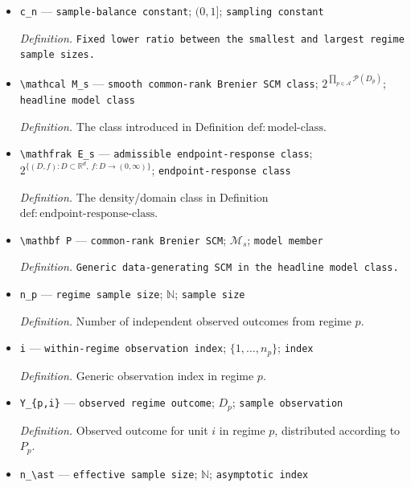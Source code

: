 \documentclass{article}
\begin{document}
\begin{itemize}
  \item \texttt{c\_\allowbreak{}n} --- \texttt{sample-\allowbreak{}balance constant}; \((0,1]\); \texttt{sampling constant}
  \par\smallskip\noindent\emph{Definition.} \texttt{Fixed lower ratio between the smallest and largest regime sample sizes.}
  \item \texttt{\textbackslash{}\allowbreak{}mathcal M\_\allowbreak{}s} --- \texttt{smooth common-\allowbreak{}rank Brenier SCM class}; \(2^{\prod_{p\in\mathcal A}\mathcal P(D_p)}\); \texttt{headline model class}
  \par\smallskip\noindent\emph{Definition.} The class introduced in Definition \(\mathrm{def:model\text{-}class}\).
  \item \texttt{\textbackslash{}\allowbreak{}mathfrak E\_\allowbreak{}s} --- \texttt{admissible endpoint-\allowbreak{}response class}; \(2^{\{(D,f):D\subset\mathbb R^d,\ f:D\to(0,\infty)\}}\); \texttt{endpoint-\allowbreak{}response class}
  \par\smallskip\noindent\emph{Definition.} The density/domain class in Definition \(\mathrm{def:endpoint\text{-}response\text{-}class}\).
  \item \texttt{\textbackslash{}\allowbreak{}mathbf P} --- \texttt{common-\allowbreak{}rank Brenier SCM}; \(\mathcal M_s\); \texttt{model member}
  \par\smallskip\noindent\emph{Definition.} \texttt{Generic data-\allowbreak{}generating SCM in the headline model class.}
  \item \texttt{n\_\allowbreak{}p} --- \texttt{regime sample size}; \(\mathbb N\); \texttt{sample size}
  \par\smallskip\noindent\emph{Definition.} Number of independent observed outcomes from regime \(p\).
  \item \texttt{i} --- \texttt{within-\allowbreak{}regime observation index}; \(\{1,\ldots,n_p\}\); \texttt{index}
  \par\smallskip\noindent\emph{Definition.} Generic observation index in regime \(p\).
  \item \texttt{Y\_\allowbreak{}\{p,\allowbreak{}i\}\allowbreak{}} --- \texttt{observed regime outcome}; \(D_p\); \texttt{sample observation}
  \par\smallskip\noindent\emph{Definition.} Observed outcome for unit \(i\) in regime \(p\), distributed according to \(P_p\).
  \item \texttt{n\_\allowbreak{}\textbackslash{}\allowbreak{}ast} --- \texttt{effective sample size}; \(\mathbb N\); \texttt{asymptotic index}

\end{itemize}
\end{document}
